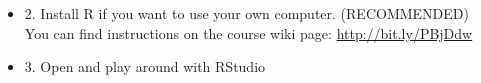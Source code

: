 \documentclass{beamer}\usepackage{graphicx, color}
\begin{document}
\begin{CJK}{UTF8}{}
{\begin{itemize}
      \item<2-> {\LARGE{2. Install R if you want to use your own computer. (RECOMMENDED)}} \\[0.25cm]
      You can find instructions on the course wiki page: \url{http://bit.ly/PBjDdw}\\[0.5cm]
  
      \item <3->{\LARGE{3. Open and play around with RStudio}}
    \end{itemize}
}


\end{CJK}
\end{document}
